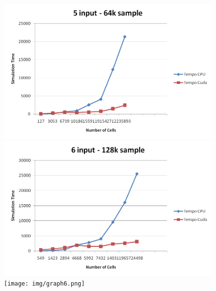 \begin{figure}
\label{graph3}
\includegraphics[width=\columnwidth]{img/graph4.png}
\label{graph4}
\includegraphics[width=\columnwidth]{img/graph5.png}
\label{graph5}
\texttt{[image: img/graph6.png]}
\label{graph6}
\end{figure}